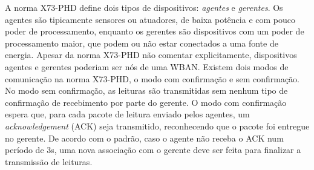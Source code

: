 A norma X73-PHD define dois tipos de dispositivos: \emph{agentes} e \emph{gerentes}. Os agentes são tipicamente sensores ou atuadores, de baixa potência e com pouco poder de processamento, enquanto os gerentes são dispositivos com um poder de processamento maior, que podem ou não estar conectados a uma fonte de energia. Apesar da norma X73-PHD não comentar explicitamente, dispositivos agentes e gerentes poderiam ser nós de uma WBAN.
Existem dois modos de comunicação na norma X73-PHD, o modo com confirmação e sem confirmação. No modo sem confirmação, as leituras são transmitidas sem nenhum tipo de confirmação de recebimento por parte do gerente. O modo com confirmação espera que, para cada pacote de leitura enviado pelos agentes, um \textit{acknowledgement} (ACK) seja transmitido, reconhecendo que o pacote foi entregue no gerente. De acordo com o padrão, caso o agente não receba o ACK num período de 3s, uma nova associação com o gerente deve ser feita para finalizar a transmissão de leituras. 

